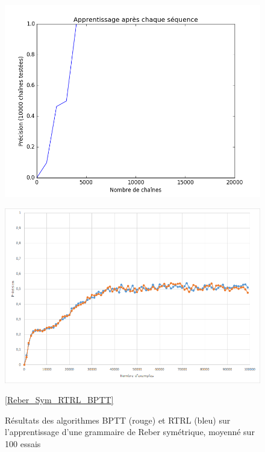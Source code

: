 \begin{figure}[h!]
\begin{center}
\includegraphics[scale=0.4]{images/chapter5/learning_curve_rtrl_reber_sequence.png}
\end{center}
\end{figure}

\begin{figure}[h!]
\begin{center}
\includegraphics[scale=0.4]{images/chapter5/rtrl_bptt.png}
\caption{Résultats des algorithmes BPTT (rouge) et RTRL (bleu) sur l'apprentissage d'une grammaire de Reber symétrique, moyenné sur 100 essais}
\ref{Reber_Sym_RTRL_BPTT}
\label{BPTT_RTRL_Reber_Sym}
\end{center}
\end{figure}

